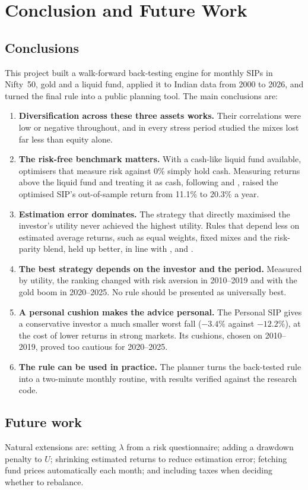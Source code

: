 \section{Conclusion and Future Work}
\label{ch:conclusion}

\subsection{Conclusions}

This project built a walk-forward back-testing engine for monthly SIPs in Nifty~50, gold and a
liquid fund, applied it to Indian data from 2000 to 2026, and turned the final rule into a public
planning tool. The main conclusions are:

\begin{enumerate}
  \item \textbf{Diversification across these three assets works.} Their correlations were low or
        negative throughout, and in every stress period studied the mixes lost far less than equity
        alone.
  \item \textbf{The risk-free benchmark matters.} With a cash-like liquid fund available, optimisers
        that measure risk against 0\% simply hold cash. Measuring returns above the liquid fund and
        treating it as cash, following \citet{tobin1958} and \citet{sharpe1994}, raised the
        optimised SIP's out-of-sample return from 11.1\% to 20.3\% a year.
  \item \textbf{Estimation error dominates.} The strategy that directly maximised the investor's
        utility never achieved the highest utility. Rules that depend less on estimated average
        returns, such as equal weights, fixed mixes and the risk-parity blend, held up better, in
        line with \citet{michaud1989}, \citet{chopra1993} and \citet{demiguel2009}.
  \item \textbf{The best strategy depends on the investor and the period.} Measured by utility, the
        ranking changed with risk aversion in 2010--2019 and with the gold boom in 2020--2025. No
        rule should be presented as universally best.
  \item \textbf{A personal cushion makes the advice personal.} The Personal SIP gives a conservative
        investor a much smaller worst fall ($-3.4\%$ against $-12.2\%$), at the cost of lower
        returns in strong markets. Its cushions, chosen on 2010--2019, proved too cautious for
        2020--2025.
  \item \textbf{The rule can be used in practice.} The planner turns the back-tested rule into a
        two-minute monthly routine, with results verified against the research code.
\end{enumerate}

\subsection{Future work}

Natural extensions are: setting $\lambda$ from a risk questionnaire; adding a drawdown penalty to
$U$; shrinking estimated returns to reduce estimation error; fetching fund prices automatically each
month; and including taxes when deciding whether to rebalance.
